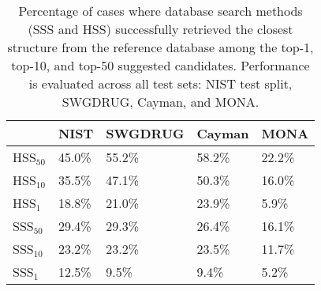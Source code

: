 

% 

\begin{table}[h!]
    \centering
    \begin{tabular}{l|l|l|l|l}
    
        ~ &NIST & SWGDRUG & Cayman & MONA \\ \hline
        HSS$_{50}$ & 45.0\% & 55.2\% & 58.2\% & 22.2\% \\ \hline
        HSS$_{10}$ & 35.5\% & 47.1\% & 50.3\% & 16.0\% \\ \hline
        HSS$_{1}$ & 18.8\% & 21.0\% & 23.9\% & 5.9\% \\ \hline
        SSS$_{50}$ & 29.4\% & 29.3\% & 26.4\% & 16.1\% \\ \hline
        SSS$_{10}$ & 23.2\% & 23.2\% & 23.5\% & 11.7\% \\ \hline
        SSS$_{1}$ & 12.5\% & 9.5\% & 9.4\% & 5.2\% \\ \hline
    \end{tabular}
    \caption{Percentage of cases where database search methods (SSS and HSS) successfully retrieved the closest structure from the reference database among the top-1, top-10, and top-50 suggested candidates. Performance is evaluated across all test sets: NIST test split, SWGDRUG, Cayman, and MONA.}
    \label{tab:db_search_comparison}
\end{table}


% 